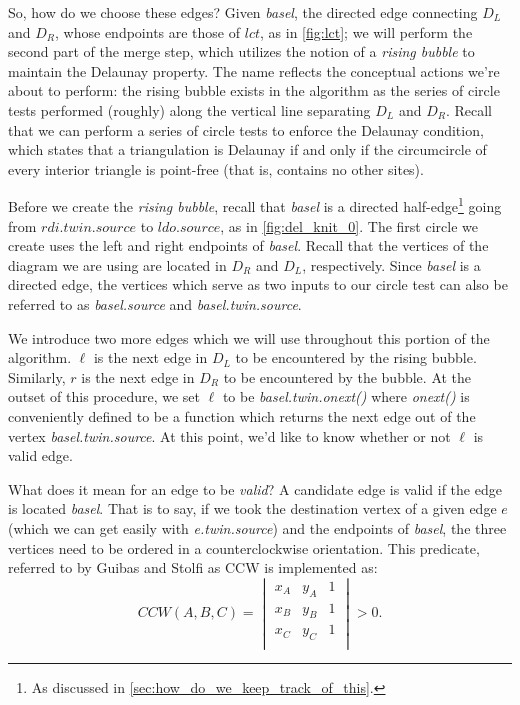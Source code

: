 \documentclass[12pt,twoside]{reedthesis}
\begin{document}
    So, how do we choose these edges? Given \emph{basel}, the directed edge connecting $D_{L}$ and $D_{R}$, whose endpoints are those of $lct$, as in \cref{fig:lct}; we will perform the second part of the merge step, which utilizes the notion of a \emph{rising bubble} to maintain the Delaunay property. The name reflects the conceptual actions we're about to perform: the rising bubble exists in the algorithm as the series of circle tests performed (roughly) along the vertical line separating $D_{L}$ and $D_{R}$. Recall that we can perform a series of circle tests to enforce the Delaunay condition, which states that a triangulation is Delaunay if and only if the circumcircle of every interior triangle is point-free (that is, contains no other sites).

    Before we create the \emph{rising bubble}, recall that \emph{basel} is a directed half-edge\footnote{As discussed in \cref{sec:how_do_we_keep_track_of_this}.} going from $rdi.twin.source$ to $ldo.source$, as in \cref{fig:del_knit_0}. The first circle we create uses the left and right endpoints of \emph{basel}. Recall that the vertices of the diagram we are using are located in $D_{R}$ and $D_{L}$, respectively. Since \emph{basel} is a directed edge, the vertices which serve as two inputs to our circle test can also be referred to as \emph{basel.source} and \emph{basel.twin.source}.\par

    We introduce two more edges which we will use throughout this portion of the algorithm. $\ell$ is the next edge in $D_{L}$ to be encountered by the rising bubble. Similarly, $r$ is the next edge in $D_{R}$ to be encountered by the bubble. At the outset of this procedure, we set $\ell$ to be \emph{basel.twin.onext()} where \emph{onext()} is conveniently defined to be a function which returns the next edge out of the vertex \emph{basel.twin.source}. At this point, we'd like to know whether or not $\ell$ is valid edge. \par 

    What does it mean for an edge to be \emph{valid}? A candidate edge is valid if the edge is located  \emph{basel}. That is to say, if we took the destination vertex of a given edge $e$ (which we can get easily with \emph{e.twin.source}) and the endpoints of \emph{basel}, the three vertices need to be ordered in a counterclockwise orientation. This predicate, referred to by Guibas and Stolfi as \textsc{CCW} is implemented as:
    $$
    CCW(A,B,C) =
    \begin{vmatrix}
    x_{A} & y_{A} & 1 \\
    x_{B} & y_{B} & 1 \\
    x_{C} & y_{C} & 1 \\  
    \end{vmatrix} > 0.
    $$  
\end{document}
